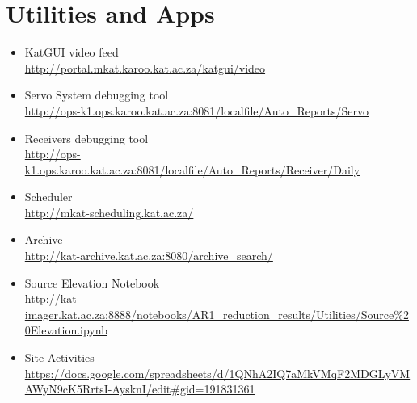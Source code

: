 \section{Utilities and Apps}
\begin{itemize}

\item KatGUI video feed\\ \url{http://portal.mkat.karoo.kat.ac.za/katgui/video}

\item Servo System debugging tool\\
\url{http://ops-k1.ops.karoo.kat.ac.za:8081/localfile/Auto_Reports/Servo}

\item Receivers debugging tool\\
\url{http://ops-k1.ops.karoo.kat.ac.za:8081/localfile/Auto_Reports/Receiver/Daily}


\item Scheduler\\
\url{http://mkat-scheduling.kat.ac.za/}

\item Archive\\			\url{http://kat-archive.kat.ac.za:8080/archive_search/}

\item Source Elevation Notebook \\	\url{http://kat-imager.kat.ac.za:8888/notebooks/AR1_reduction_results/Utilities/Source%20Elevation.ipynb}

\item Site Activities\\		\url{https://docs.google.com/spreadsheets/d/1QNhA2IQ7aMkVMqF2MDGLyVMAWyN9cK5RrtsI-AysknI/edit#gid=191831361}
\end{itemize}


